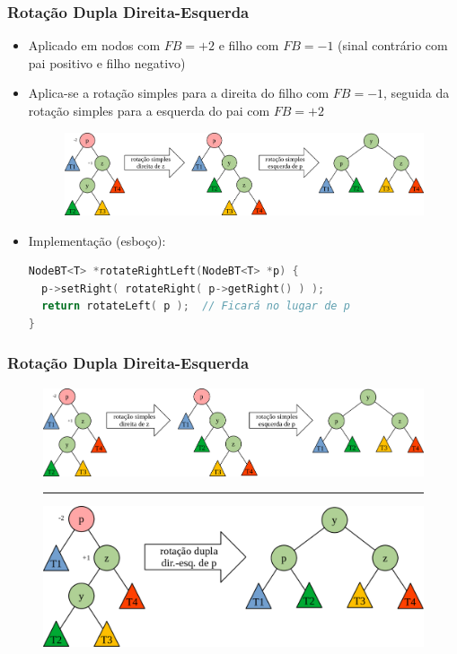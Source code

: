 \documentclass[aspectratio=169]{beamer}
\begin{document}
\begin{frame}[fragile]\frametitle{Rotação Dupla Direita-Esquerda}
\begin{itemize}
	\item Aplicado em nodos com $FB = +2$ e filho com $FB = -1$ (sinal contrário com pai positivo e filho negativo)
	\item Aplica-se a rotação simples para a direita do filho com $FB = -1$, seguida da rotação simples para a esquerda do pai com $FB = +2$
\begin{figure}[h]
	\centering
	\includegraphics[height=0.3\paperheight]{imagens/rot_dup_dir_esq0.png}
\end{figure}
	\item Implementação (esboço):
\begin{lstlisting}[language=C++,basicstyle=\ttfamily\scriptsize]
NodeBT<T> *rotateRightLeft(NodeBT<T> *p) {
  p->setRight( rotateRight( p->getRight() ) );
  return rotateLeft( p );  // Ficará no lugar de p
}
\end{lstlisting}
\end{itemize}
\end{frame}

\begin{frame}[fragile]\frametitle{Rotação Dupla Direita-Esquerda}
\begin{figure}[h]
	\centering
	\includegraphics[height=0.33\paperheight]{imagens/rot_dup_dir_esq0.png}
	\vspace{3mm}
	\hrule
	\vspace{3mm}
	\includegraphics[height=0.33\paperheight]{imagens/rot_dup_dir_esq.png}
\end{figure}
\end{frame}
\end{document}
